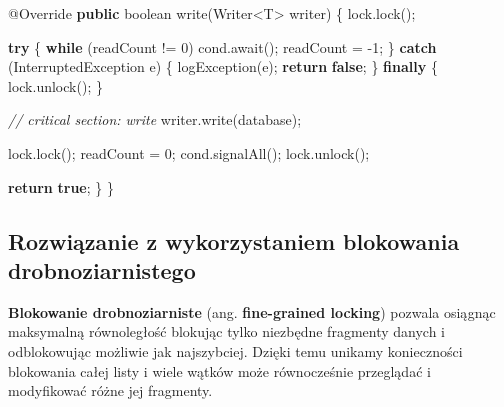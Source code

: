 \documentclass[11pt]{article}
\newenvironment{Shaded}{}{}
\newcommand{\KeywordTok}[1]{\textcolor[rgb]{0.00,0.44,0.13}{\textbf{{#1}}}}
\newcommand{\DataTypeTok}[1]{\textcolor[rgb]{0.56,0.13,0.00}{{#1}}}
\newcommand{\DecValTok}[1]{\textcolor[rgb]{0.25,0.63,0.44}{{#1}}}
\newcommand{\CommentTok}[1]{\textcolor[rgb]{0.38,0.63,0.69}{\textit{{#1}}}}
\newcommand{\FunctionTok}[1]{\textcolor[rgb]{0.02,0.16,0.49}{{#1}}}
\newcommand{\NormalTok}[1]{{#1}}
\newcommand{\ControlFlowTok}[1]{\textcolor[rgb]{0.00,0.44,0.13}{\textbf{{#1}}}}
\newcommand{\OperatorTok}[1]{\textcolor[rgb]{0.40,0.40,0.40}{{#1}}}
\newcommand{\BuiltInTok}[1]{{#1}}
\newcommand{\AttributeTok}[1]{\textcolor[rgb]{0.49,0.56,0.16}{{#1}}}
\begin{document}
\begin{Shaded}
\begin{Highlighting}[]
    \AttributeTok{@Override}
    \KeywordTok{public} \DataTypeTok{boolean} \FunctionTok{write}\OperatorTok{(}\BuiltInTok{Writer}\OperatorTok{\textless{}}\NormalTok{T}\OperatorTok{\textgreater{}}\NormalTok{ writer}\OperatorTok{)} \OperatorTok{\{}
\NormalTok{        lock}\OperatorTok{.}\FunctionTok{lock}\OperatorTok{();}

        \ControlFlowTok{try} \OperatorTok{\{}
            \ControlFlowTok{while} \OperatorTok{(}\NormalTok{readCount }\OperatorTok{!=} \DecValTok{0}\OperatorTok{)}
\NormalTok{                cond}\OperatorTok{.}\FunctionTok{await}\OperatorTok{();}
\NormalTok{            readCount }\OperatorTok{=} \OperatorTok{{-}}\DecValTok{1}\OperatorTok{;}
        \OperatorTok{\}} \ControlFlowTok{catch} \OperatorTok{(}\BuiltInTok{InterruptedException}\NormalTok{ e}\OperatorTok{)} \OperatorTok{\{}
            \FunctionTok{logException}\OperatorTok{(}\NormalTok{e}\OperatorTok{);}
            \ControlFlowTok{return} \KeywordTok{false}\OperatorTok{;}
        \OperatorTok{\}} \ControlFlowTok{finally} \OperatorTok{\{}
\NormalTok{            lock}\OperatorTok{.}\FunctionTok{unlock}\OperatorTok{();}
        \OperatorTok{\}}

        \CommentTok{// critical section: write}
\NormalTok{        writer}\OperatorTok{.}\FunctionTok{write}\OperatorTok{(}\NormalTok{database}\OperatorTok{);}

\NormalTok{        lock}\OperatorTok{.}\FunctionTok{lock}\OperatorTok{();}
\NormalTok{        readCount }\OperatorTok{=} \DecValTok{0}\OperatorTok{;}
\NormalTok{        cond}\OperatorTok{.}\FunctionTok{signalAll}\OperatorTok{();}
\NormalTok{        lock}\OperatorTok{.}\FunctionTok{unlock}\OperatorTok{();}

        \ControlFlowTok{return} \KeywordTok{true}\OperatorTok{;}
    \OperatorTok{\}}
\OperatorTok{\}}
\end{Highlighting}
\end{Shaded}

    \hypertarget{rozwiux105zanie-z-wykorzystaniem-blokowania-drobnoziarnistego}{%
\subsection{Rozwiązanie z wykorzystaniem blokowania
drobnoziarnistego}\label{rozwiux105zanie-z-wykorzystaniem-blokowania-drobnoziarnistego}}

\textbf{Blokowanie drobnoziarniste} (ang. \textbf{fine-grained locking})
pozwala osiągnąc maksymalną równoległość blokując tylko niezbędne
fragmenty danych i odblokowując możliwie jak najszybciej. Dzięki temu
unikamy konieczności blokowania całej listy i wiele wątków może
równocześnie przeglądać i modyfikować różne jej fragmenty.
\end{document}
